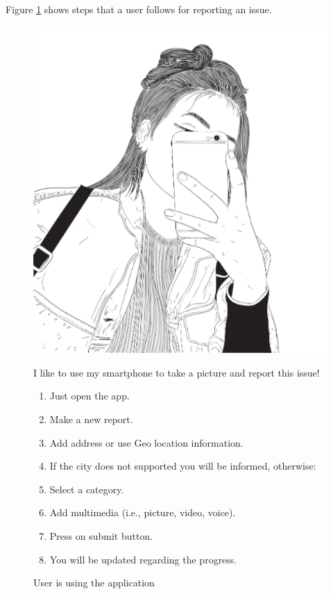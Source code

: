 \begin{itemize}
        Figure \ref{fig:user-is-using-the-app} shows steps that a user follows for reporting an issue.
        \newpage
        \begin{figure}[!ht]
            \centering
            \caption{User is using the application}
            \label{fig:user-is-using-the-app}
            \begin{minipage}{0.4\textwidth}
                \includegraphics[width=\linewidth]{images/Image_ (1).png} 
            \end{minipage}%
            \hspace{0.05\textwidth} %
            \begin{minipage}{0.5\textwidth}
                I like to use my smartphone to take a picture and report this issue!
                \begin{enumerate}
                    \raggedright
                    \item Just open the app.
                    \item Make a new report.
                    \item Add address or use Geo location information.
                    \item If the city does not supported you will be informed, otherwise:
                    \item Select a category.
                    \item Add multimedia (i.e., picture, video, voice).
                    \item Press on submit button.
                    \item You will be updated regarding the progress.
                \end{enumerate}
            \end{minipage}
        \end{figure}


\end{itemize}
